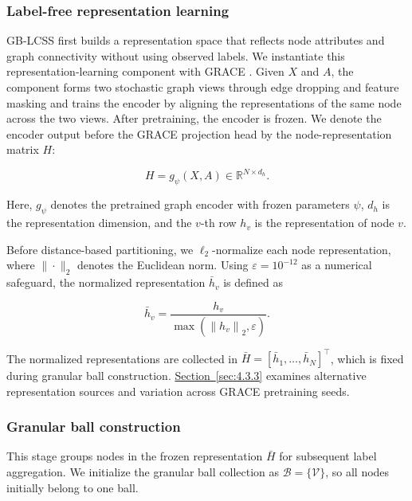 \documentclass[10pt,letterpaper,nopreprintline]{elsarticle}
\theoremstyle{plain}
\begin{document}
\subsubsection{Label-free representation learning}\label{sec:3.2.1}

GB-LCSS first builds a representation space that reflects node attributes and graph connectivity without using observed labels. We instantiate this representation-learning component with GRACE \cite{ref12}. Given \(X\) and \(A\), the component forms two stochastic graph views through edge dropping and feature masking and trains the encoder by aligning the representations of the same node across the two views. After pretraining, the encoder is frozen. We denote the encoder output before the GRACE projection head by the node-representation matrix \(H\):

\begin{equation}\label{eq:2}
H = g_{\psi}(X,A) \in \mathbb{R}^{N \times d_{h}}.
\end{equation}

Here, \(g_{\psi}\) denotes the pretrained graph encoder with frozen parameters \(\psi\), \(d_{h}\) is the representation dimension, and the \(v\)-th row \(h_{v}\) is the representation of node \(v\).

\Needspace{64pt}

Before distance-based partitioning, we \(\ell_2\)-normalize each node representation, where \(\|\cdot\|_2\) denotes the Euclidean norm. Using \(\varepsilon = 10^{- 12}\) as a numerical safeguard, the normalized representation \({\bar{h}}_{v}\) is defined as

\begin{equation}\label{eq:3}
{\bar{h}}_{v} = \frac{h_{v}}{\max(\left\| h_{v} \right\|_{2},\varepsilon)}.
\end{equation}

The normalized representations are collected in \(\bar{H} = \left\lbrack {\bar{h}}_{1},\ldots,{\bar{h}}_{N} \right\rbrack^{\top}\), which is fixed during granular ball construction. \hyperref[sec:4.3.3]{Section~\ref*{sec:4.3.3}} examines alternative representation sources and variation across GRACE pretraining seeds.

\subsubsection{Granular ball construction}\label{sec:3.2.2}

This stage groups nodes in the frozen representation \(\bar H\) for subsequent label aggregation. We initialize the granular ball collection as \(\mathcal B=\{\mathcal V\}\), so all nodes initially belong to one ball.
\end{document}
